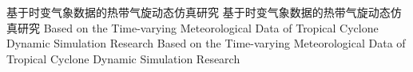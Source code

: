 
\thesistitle
{基于时变气象数据的热带气旋动态仿真研究}
{基于时变气象数据的热带气旋动态仿真研究}
{Based on the Time-varying Meteorological Data of Tropical Cyclone Dynamic Simulation Research}
{Based on the Time-varying Meteorological Data of Tropical Cyclone Dynamic Simulation Research}

